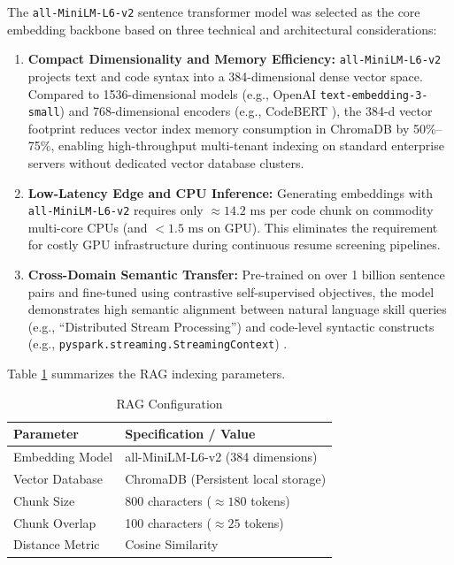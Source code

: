 The \texttt{all-MiniLM-L6-v2} sentence transformer model \cite{ref35, ref41} was selected as the core embedding backbone based on three technical and architectural considerations:
\begin{enumerate}[leftmargin=*, label=\arabic*.]
    \item \textbf{Compact Dimensionality and Memory Efficiency:} \texttt{all-MiniLM-L6-v2} projects text and code syntax into a 384-dimensional dense vector space. Compared to 1536-dimensional models (e.g., OpenAI \texttt{text-embedding-3-small}) and 768-dimensional encoders (e.g., CodeBERT \cite{ref37}), the 384-d vector footprint reduces vector index memory consumption in ChromaDB by 50\%--75\%, enabling high-throughput multi-tenant indexing on standard enterprise servers without dedicated vector database clusters.
    \item \textbf{Low-Latency Edge and CPU Inference:} Generating embeddings with \texttt{all-MiniLM-L6-v2} requires only $\approx 14.2\text{ ms}$ per code chunk on commodity multi-core CPUs (and $<1.5\text{ ms}$ on GPU). This eliminates the requirement for costly GPU infrastructure during continuous resume screening pipelines.
    \item \textbf{Cross-Domain Semantic Transfer:} Pre-trained on over 1 billion sentence pairs and fine-tuned using contrastive self-supervised objectives, the model demonstrates high semantic alignment between natural language skill queries (e.g., ``Distributed Stream Processing'') and code-level syntactic constructs (e.g., \texttt{pyspark.streaming.StreamingContext}) \cite{ref47, ref49}.
\end{enumerate}

Table \ref{tab:ragconfig} summarizes the RAG indexing parameters.

\begin{table}[htbp]
\centering
\small
\setlength{\tabcolsep}{10pt}
\caption{RAG Configuration}
\label{tab:ragconfig}
\begin{tabularx}{\textwidth}{@{}lX@{}}
\toprule
\textbf{Parameter} & \textbf{Specification / Value} \\ \midrule
Embedding Model & all-MiniLM-L6-v2 (384 dimensions) \\
Vector Database & ChromaDB (Persistent local storage) \\
Chunk Size & 800 characters ($\approx 180$ tokens) \\
Chunk Overlap & 100 characters ($\approx 25$ tokens) \\
Distance Metric & Cosine Similarity \\ \bottomrule
\end{tabularx}
\end{table}

